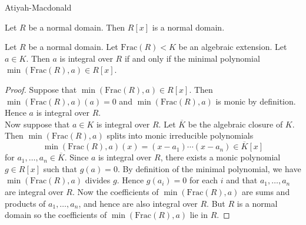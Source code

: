 \documentclass[a4paper]{article}
\begin{document}
Atiyah-Macdonald

\begin{prp}{}{} Let $R$ be a normal domain. Then $R[x]$ is a normal domain. 
\end{prp}

\begin{prp}{}{} Let $R$ be a normal domain. Let $\text{Frac}(R)<K$ be an algebraic extension. Let $a\in K$. Then $a$ is integral over $R$ if and only if the minimal polynomial $\min(\text{Frac}(R),a)\in R[x]$. 
\begin{proof}
Suppose that $\min(\text{Frac}(R),a)\in R[x]$. Then $\min(\text{Frac}(R),a)(a)=0$ and $\min(\text{Frac}(R),a)$ is monic by definition. Hence $a$ is integral over $R$. \\

Now suppose that $a\in K$ is integral over $R$. Let $\overline{K}$ be the algebraic closure of $K$. Then $\min(\text{Frac}(R),a)$ splits into monic irreducible polynomials $$\min(\text{Frac}(R),a)(x)=(x-a_1)\cdots(x-a_n)\in\overline{K}[x]$$ for $a_1,\dots,a_n\in\overline{K}$. Since $a$ is integral over $R$, there exists a monic polynomial $g\in R[x]$ such that $g(a)=0$. By definition of the minimal polynomial, we have $\min(\text{Frac}(R),a)$ divides $g$. Hence $g(a_i)=0$ for each $i$ and that $a_1,\dots,a_n$ are integral over $R$. Now the coefficients of $\min(\text{Frac}(R),a)$ are sums and products of $a_1,\dots,a_n$, and hence are also integral over $R$. But $R$ is a normal domain so the coefficients of $\min(\text{Frac}(R),a)$ lie in $R$. 
\end{proof}
\end{prp}
\end{document}
